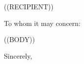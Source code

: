 \documentclass{letter}
\begin{document}
\begin{letter}{((RECIPIENT))}
\opening{To whom it may concern:}
((BODY))
\closing{Sincerely,\\
	 \\
}
\end{letter}
\end{document}
